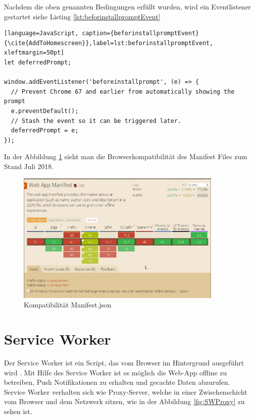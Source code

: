 Nachdem die oben genannten Bedingungen erfüllt wurden, wird ein Eventlistener gestartet siehe Listing \ref{lst:beforinstallpromptEvent}


\begin{lstlisting}[language=JavaScript, caption={beforinstallpromptEvent} {\cite{AddToHomescreen}},label=lst:beforinstallpromptEvent, xleftmargin=50pt]
let deferredPrompt;

window.addEventListener('beforeinstallprompt', (e) => {
  // Prevent Chrome 67 and earlier from automatically showing the prompt
  e.preventDefault();
  // Stash the event so it can be triggered later.
  deferredPrompt = e;
});
\end{lstlisting}

In der Abbildung \ref{fig:BrowserManifest} sieht man die Browserkompatibilität des Manifest Files zum Stand Juli 2018.
 
\begin{figure}[H]
	\centering
	\includegraphics[width=10cm]{BilderAllgemein/BrowserManifest}\medskip
	\caption{Kompatibilität Manifest.json \cite{BrowserSupport}}
	\label{fig:BrowserManifest}
\end{figure}
 


\section{Service Worker}\label{sub:ServiceWorker}
Der Service Worker ist ein Script, das vom Browser im Hintergrund ausgeführt wird \cite{ServiceWorkerRegistration}. Mit Hilfe des Service Worker ist es möglich die \acs{Web-App} offline zu betreiben, Push Notifikationen zu erhalten und gecachte Daten abzurufen. Service Worker verhalten sich wie Proxy-Server, welche in einer Zwischenschicht vom Browser und dem Netzwerk sitzen, wie in der Abbildung \ref{fig:SWProxy} zu sehen ist.

